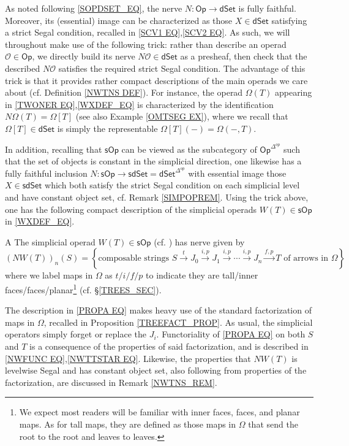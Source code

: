 \documentclass[a4paper,10pt]{article}%
\numberwithin{equation}{section}
\numberwithin{figure}{section}
\theoremstyle{definition} %
\newcommand{\Op}{\mathsf{Op}}
\newcommand{\sOp}{\mathsf{sOp}}
\renewcommand{\O}{\mathcal O}
\begin{document}
As noted following \eqref{SOPDSET_EQ},
the nerve $N\colon \mathsf{Op} \to \mathsf{dSet}$
is fully faithful.
Moreover, its (essential) image
can be characterized as those 
$X \in \mathsf{dSet}$ satisfying a strict Segal condition,
recalled in \eqref{SCV1 EQ},\eqref{SCV2 EQ}.
As such, we will throughout make use of the following trick:
rather than describe an operad $\O \in \mathsf{Op}$,
we directly build its nerve 
$N\O \in \mathsf{dSet}$ as a presheaf,
then check that the described $N\O$ satisfies the required strict Segal condition.
The advantage of this trick is that it provides rather compact descriptions of the main operads we care about 
(cf. Definition \ref{NWTNS DEF}).
For instance, 
the operad $\Omega(T)$ appearing in 
\eqref{TWONER EQ},\eqref{WXDEF_EQ}
is characterized by the identification $N\Omega(T) =\Omega[T]$
(see also Example \ref{OMTSEG EX}), 
where we recall that $\Omega[T]\in \mathsf{dSet}$
is simply the representable $\Omega[T](-) = \Omega(-,T)$.


In addition, recalling that $\sOp$ can be viewed as the subcategory
of $\Op^{\Delta^{op}}$ such that the set of objects is constant in the simplicial direction,
one likewise has a fully faithful inclusion
$N\colon \sOp \to \mathsf{sdSet} = \mathsf{dSet}^{\Delta^{op}}$
with essential image those
$X \in \mathsf{sdSet}$
which both satisfy the strict Segal condition on each simplicial level and have constant object set, 
cf. Remark \ref{SIMPOPREM}.
Using the trick above,
one has the following compact description
of the simplicial operads $W(T) \in \sOp$ in \eqref{WXDEF_EQ}.

\begin{customprop}{A}\label{PROPA PROP}
The simplicial operad $W(T) \in \sOp$
(cf. \cite[(4.1)]{CM13b})
has nerve given by
\begin{equation}\label{PROPA EQ}
	\left(NW(T)\right)_{n}(S)
=
	\left\{
	\text{composable strings }
	S \xrightarrow{t} 
	J_0 \xrightarrow{i,p} 
	J_1 \xrightarrow{i,p} 
	\cdots \xrightarrow{i,p}
	J_n \xrightarrow{f,p}
	T
	\text{ of arrows in $\Omega$}
\right\}
\end{equation}
where we label maps in $\Omega$ as
$t/i/f/p$
to indicate they are 
tall/inner faces/faces/planar\footnote{
We expect most readers will be familiar with inner faces, faces, and planar maps. 
As for tall maps, they are defined 
as those maps in $\Omega$
that send the root to the root and leaves to leaves.
}
(cf. \S \ref{TREES_SEC}).
\end{customprop}
The description in \eqref{PROPA EQ}
makes heavy use of the standard factorization of maps in $\Omega$,
recalled in Proposition \ref{TREEFACT_PROP}.
As usual, the simplicial operators simply forget or replace the $J_i$.
Functoriality of \eqref{PROPA EQ} on both $S$ and $T$
is a consequence of the properties of said factorization,
and is described in \eqref{NWFUNC EQ},\eqref{NWTTSTAR EQ}.
Likewise, the properties that 
$NW(T)$ is levelwise Segal and 
has constant object set, also following from properties of the factorization, are discussed in Remark \ref{NWTNS_REM}.
\end{document}
